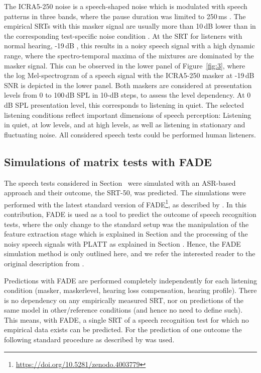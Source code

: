 \documentclass[10pt,a4paper,twocolumn]{article}
\begin{document}
%
The ICRA5-250 noise is a speech-shaped noise which is modulated with speech patterns in three bands, where the pause duration was limited to 250\,ms \citep{wagener2006}.
%
The empirical SRTs with this masker signal are usually more than 10\,dB lower than in the corresponding test-specific noise condition \citep{hochmuth2015}.
%
At the SRT for listeners with normal hearing, -19\,dB \citep{hochmuth2015}, this results in a noisy speech signal with a high dynamic range, where the spectro-temporal maxima of the mixtures are dominated by the masker signal.
%
This can be observed in the lower panel of Figure~\ref{fig:3}, where the log Mel-spectrogram of a speech signal with the ICRA5-250 masker at -19\,dB SNR is depicted in the lower panel.
%
Both maskers are considered at presentation levels from 0 to 100\,dB SPL in 10-dB steps, to assess the level dependency.
%
At 0\,dB SPL presentation level, this corresponds to listening in quiet.
%
The selected listening conditions reflect important dimensions of speech perception: Listening in quiet, at low levels, and at high levels, as well as listening in stationary and fluctuating noise.
%
All considered speech tests could be performed human listeners.

\subsection*{Simulations of matrix tests with FADE}
\label{sec:fade}
%
The speech tests considered in Section~ were simulated with an ASR-based approach and their outcome, the SRT-50, was predicted.
%
The simulations were performed with the latest standard version of FADE\footnote{\url{https://doi.org/10.5281/zenodo.4003779}}, as described by \cite{schaedler2016a}.
%
In this contribution, FADE is used as a tool to predict the outcome of speech recognition tests, where the only change to the standard setup was the manipulation of the feature extraction stage which is explained in Section  and the processing of the noisy speech signals with PLATT as explained in Section .
%
Hence, the FADE simulation method is only outlined here, and we refer the interested reader to the original description from \cite{schaedler2016a}.

Predictions with FADE are performed completely independently for each listening condition (masker, maskerlevel, hearing loss compensation, hearing profile).
%
There is no dependency on any empirically measured SRT, nor on predictions of the same model in other/reference conditions (and hence no need to define such).
%
This means, with FADE, a single SRT of a speech recognition test for which no empirical data exists can be predicted.
%
For the prediction of one outcome the following standard procedure as described by \cite{schaedler2016a} was used.
\end{document}
